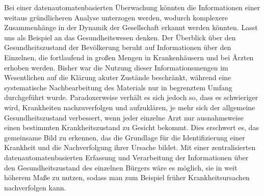 {Bei einer datenautomatenbasierten Überwachung könnten die Informationen einer weitaus gründlicheren Analyse unterzogen werden, wodurch komplexere Zusammenhänge in der Dynamik der Gesellschaft erkannt werden könnten. Lasst uns als Beispiel an das Gesundheitswesen denken. Der Überblick über den Gesundheitszustand der Bevölkerung beruht auf Informationen über den Einzelnen, die fortlaufend in großen Mengen in Krankenhäusern und bei Ärzten erhoben werden. Bisher war die Nutzung dieser Informationsmengen im Wesentlichen auf die Klärung akuter Zustände beschränkt, während eine systematische Nachbearbeitung des Materials nur in begrenztem Umfang durchgeführt wurde. Paradoxerweise verhält es sich jedoch so, dass es schwieriger wird, Krankheiten nachzuverfolgen und aufzuklären, je mehr sich der allgemeine Gesundheitszustand verbessert, wenn jeder einzelne Arzt nur ausnahmsweise einen bestimmten Krankheitszustand zu Gesicht bekommt. Dies erschwert es, das gemeinsame Bild zu erkennen, das die Grundlage für die Identifizierung einer Krankheit und die Nachverfolgung ihrer Ursache bildet. Mit einer zentralisierten datenautomatenbasierten Erfassung und Verarbeitung der Informationen über den Gesundheitszustand des einzelnen Bürgers wäre es möglich, sie in weit höherem Maße zu nutzen, sodass man zum Beispiel früher Krankheitsursachen nachverfolgen kann.
}


